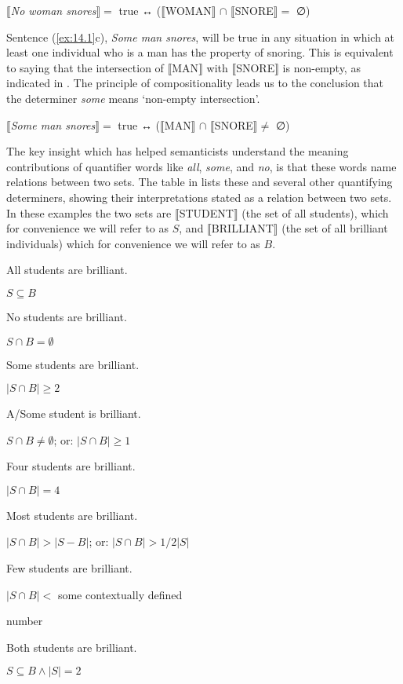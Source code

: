 \ea \label{ex:14.3}
{}$\llbracket$\textit{No woman snores}$\rrbracket =$ true ↔  ($\llbracket$WOMAN$\rrbracket$  ${\cap}$ $\llbracket$SNORE$\rrbracket =$ ∅)
\z


Sentence (\ref{ex:14.1}c), \textit{Some man snores}, will be true in any situation in which at least one individual who is a man has the property of snoring. This is equivalent to saying that the intersection of $\llbracket$MAN$\rrbracket$  with $\llbracket$SNORE$\rrbracket$  is non-empty, as indicated in . The principle of compositionality leads us to the conclusion that the determiner \textit{some} means ‘non-empty intersection’.


\ea \label{ex:14.4}
{}$\llbracket$\textit{Some man snores}$\rrbracket =$ true ↔  ($\llbracket$MAN$\rrbracket$  ${\cap}$ $\llbracket$SNORE$\rrbracket \neq$ ∅)
\z


The key insight which has helped semanticists understand the meaning contributions of quantifier words like \textit{all}, \textit{some}, and \textit{no}, is that these words name relations between two sets. The table in  lists these and several other quantifying determiners, showing their interpretations stated as a relation between two sets. In these examples the two sets are $\llbracket$STUDENT$\rrbracket$  (the set of all students), which for convenience we will refer to as $S$, and $\llbracket$BRILLIANT$\rrbracket$  (the set of all brilliant individuals) which for convenience we will refer to as $B$.

\ea \label{ex:14.5}
\ea \parbox{4.5cm}{All students are brilliant.}\parbox{6cm}{$S \subseteq B$}
\ex \parbox{4.5cm}{No students are brilliant.}\parbox{6cm}{$S  \cap {B} = \emptyset$}
\ex \parbox{4.5cm}{Some students are brilliant.}\parbox{6cm}{$|S \cap B| \geq 2$}
\ex \parbox{4.5cm}{A/Some student is brilliant.}\parbox{6cm}{$S  \cap B \neq  \emptyset$; or:  $|S \cap B| \geq 1$}
\ex \parbox{4.5cm}{Four students are brilliant.}\parbox{6cm}{$|S \cap B | = 4$\footnotemark{}}
\ex \parbox{4.5cm}{Most students are brilliant.}\parbox{6cm}{$|S \cap B | > |S - B|$; or: $|S \cap B| > 1/2|S|$}
\ex \parbox{4.5cm}{Few students are brilliant.}\parbox[t]{5.7cm}{$|S \cap B | <$ some contextually defined\\\rule{0pt}{0pt}\hfill number}
\ex \parbox{4.5cm}{Both students are brilliant.}\parbox{6cm}{$S  \subseteq B  \wedge |S| = 2$}\label{ex:14.5h}
\z \z
{}

